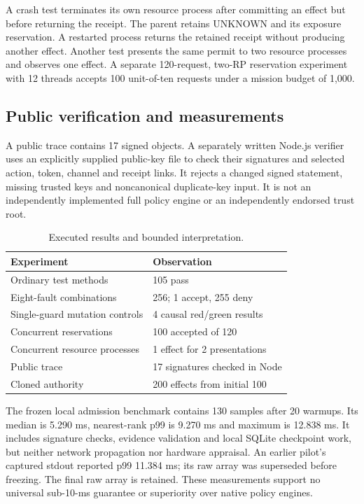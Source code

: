 \documentclass[journal,10pt]{IEEEtran}
\begin{document}
A crash test terminates its own resource process after committing an effect but before returning the receipt. The parent retains UNKNOWN and its exposure reservation. A restarted process returns the retained receipt without producing another effect. Another test presents the same permit to two resource processes and observes one effect. A separate 120-request, two-RP reservation experiment with 12 threads accepts 100 unit-of-ten requests under a mission budget of 1,000.

\subsection{Public verification and measurements}
A public trace contains 17 signed objects. A separately written Node.js verifier uses an explicitly supplied public-key file to check their signatures and selected action, token, channel and receipt links. It rejects a changed signed statement, missing trusted keys and noncanonical duplicate-key input. It is not an independently implemented full policy engine or an independently endorsed trust root.

\begin{table}[t]
\centering\caption{Executed results and bounded interpretation.}\label{tab:results}
\small\setlength{\tabcolsep}{4pt}\begin{tabular}{p{}p{}}
\toprule Experiment & Observation\\\midrule
Ordinary test methods & 105 pass\\
Eight-fault combinations & 256; 1 accept, 255 deny\\
Single-guard mutation controls & 4 causal red/green results\\
Concurrent reservations & 100 accepted of 120\\
Concurrent resource processes & 1 effect for 2 presentations\\
Public trace & 17 signatures checked in Node\\
Cloned authority & 200 effects from initial 100\\\bottomrule
\end{tabular}
\end{table}

The frozen local admission benchmark contains 130 samples after 20 warmups. Its median is 5.290 ms, nearest-rank p99 is 9.270 ms and maximum is 12.838 ms. It includes signature checks, evidence validation and local SQLite checkpoint work, but neither network propagation nor hardware appraisal. An earlier pilot's captured stdout reported p99 11.384 ms; its raw array was superseded before freezing. The final raw array is retained. These measurements support no universal sub-10-ms guarantee or superiority over native policy engines.
\end{document}
